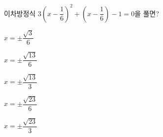 이차방정식 $3\left(x-\dfrac{1}{6}\right)^2+\left(x-\dfrac{1}{6}\right)-1=0$을 풀면?
\begin{choices32}{\rule[-3ex]{0pt}{8ex}$x=\pm\dfrac{\sqrt{3}}{6}$}{\rule[-3ex]{0pt}{8ex}$x=\pm\dfrac{\sqrt{13}}{6}$}{\rule[-3ex]{0pt}{8ex}$x=\pm\dfrac{\sqrt{13}}{3}$}{\rule[-3ex]{0pt}{8ex}$x=\pm\dfrac{\sqrt{23}}{6}$}{\rule[-3ex]{0pt}{8ex}$x=\pm\dfrac{\sqrt{23}}{3}$}\end{choices32}
